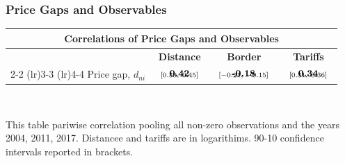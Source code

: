 \documentclass[10pt,pdftex,aspectratio=1610]{beamer}
\date{\today}
\theoremstyle{definition}
\begin{document}
\begin{frame}[t]
\frametitle{Price Gaps and Observables}
\footnotesize

\begin{table}[!t]
\footnotesize
\renewcommand{\arraystretch}{1.95}
\setlength {\tabcolsep}{2.5mm}
\begin{center}\label{tb:data_rslts}
\begin{tabular}[t]{l c c c }
\multicolumn{4}{c}{\normalsize \textbf{ Correlations of Price Gaps and Observables}}
\\
\hline
\hline
& \textbf{Distance} & \textbf{Border} & \textbf{Tariffs} \\
\cmidrule(r){2-2}  \cmidrule(lr){3-3} \cmidrule(lr){4-4}
Price gap, $d_{ni}$     & $\begin{array}{c}{\textbf{0.42}} \vspace{-.4cm}\\ \scriptstyle{[0.39,   \ 0.45]}\end{array}$ &
$\begin{array}{c}{\textbf{-0.18}} \vspace{-.4cm}\\ \scriptstyle{[-0.21,   \ -0.15]}\end{array}$
& $\begin{array}{c}{\textbf{0.34}} \vspace{-.4cm}\\ \scriptstyle{[0.31,   \ 0.36]}\end{array}$  \\
\hline
\end{tabular}
\\[0.75ex]
\parbox{4.5in}{\footnotesize This table pariwise correlation pooling all non-zero observations and the years 2004, 2011, 2017. Distancee and tariffs are in logarithims. 90-10 confidence intervals reported in brackets. }
\end{center}
\end{table}


\end{frame}


\end{document}
